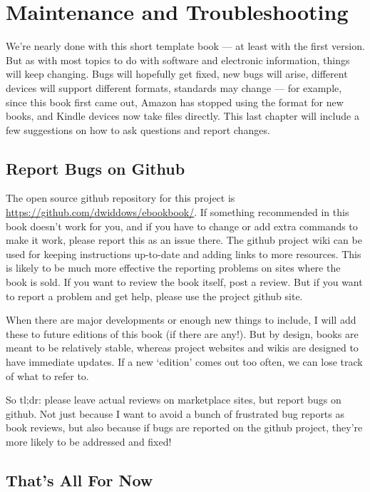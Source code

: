 \chapter{Maintenance and Troubleshooting}

We're nearly done with this short template book --- at least with the first version.
But as with most topics to do with software and electronic information, things will keep changing.
Bugs will hopefully get fixed, new bugs will arise, different devices will support different formats,
standards may change --- for example, since this book first came out, Amazon has stopped
using the  format for new books, and Kindle devices now take 
files directly. This last chapter will include a few suggestions on how
to ask questions and report changes.

\section{Report Bugs on Github}

The open source github repository for this project is {\small \url{https://github.com/dwiddows/ebookbook/}}.
If something recommended in this book doesn't work for you, and if you have to change or add extra
commands to make it work, please report this as an issue there. The github project wiki can be used for
keeping instructions up-to-date and adding links to more resources. This is likely to be much more effective
the reporting problems on sites where the book is sold.
If you want to review the book itself, post a review. But if you want to report a problem and get
help, please use the project github site.

When there are major developments or enough new things to include, I will add these to future
editions of this book (if there are any!). But by design, books are meant to be relatively stable, whereas
project websites and wikis are designed to have immediate updates. If a new `edition' comes out too often,
we can lose track of what to refer to.

So tl;dr: please leave actual reviews on marketplace sites, but report bugs on github. Not just because
I want to avoid a bunch of frustrated bug reports as book reviews, but also because if
bugs are reported on the github project, they're more likely to be addressed and fixed!

\section{That's All For Now}

